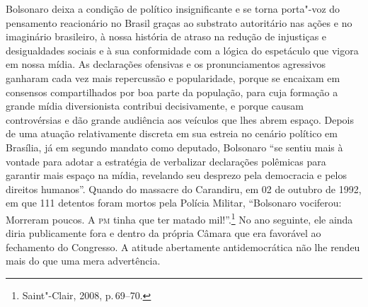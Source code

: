 Bolsonaro deixa a condição de político insignificante e se torna
porta"-voz do pensamento reacionário no Brasil graças ao substrato
autoritário nas ações e no imaginário brasileiro, à nossa história de
atraso na redução de injustiças e desigualdades sociais e à sua
conformidade com a lógica do espetáculo que vigora em nossa mídia. As
declarações ofensivas e os pronunciamentos agressivos ganharam cada vez
mais repercussão e popularidade, porque se encaixam em consensos
compartilhados por boa parte da população, para cuja formação a grande
mídia diversionista contribui decisivamente, e porque causam
controvérsias e dão grande audiência aos veículos que lhes abrem espaço.
Depois de uma atuação relativamente discreta em sua estreia no cenário
político em Brasília, já em segundo mandato como deputado, Bolsonaro
``se sentiu mais à vontade para adotar a estratégia de verbalizar
declarações polêmicas para garantir mais espaço na mídia, revelando seu
desprezo pela democracia e pelos direitos humanos''. Quando do massacre
do Carandiru, em 02 de outubro de 1992, em que 111 detentos foram mortos
pela Polícia Militar, ``Bolsonaro vociferou: Morreram poucos. A \textsc{pm} tinha
que ter matado mil!''.\footnote{Saint"-Clair, 2008, p.\,69--70.} No ano
seguinte, ele ainda diria publicamente fora e dentro da própria Câmara
que era favorável ao fechamento do Congresso. A atitude abertamente
antidemocrática não lhe rendeu mais do que uma mera advertência.

